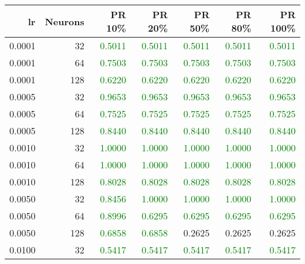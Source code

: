 \begin{tabular}{rrrrrrr}
\toprule
lr & Neurons & PR 10\% & PR 20\% & PR 50\% & PR 80\% & PR 100\% \\
\midrule
0.0001 & 32 & \textcolor{green} {0.5011} & \textcolor{green} {0.5011} & \textcolor{green} {0.5011} & \textcolor{green} {0.5011} & \textcolor{green} {0.5011} \\
0.0001 & 64 & \textcolor{green} {0.7503} & \textcolor{green} {0.7503} & \textcolor{green} {0.7503} & \textcolor{green} {0.7503} & \textcolor{green} {0.7503} \\
0.0001 & 128 & \textcolor{green} {0.6220} & \textcolor{green} {0.6220} & \textcolor{green} {0.6220} & \textcolor{green} {0.6220} & \textcolor{green} {0.6220} \\
0.0005 & 32 & \textcolor{green} {0.9653} & \textcolor{green} {0.9653} & \textcolor{green} {0.9653} & \textcolor{green} {0.9653} & \textcolor{green} {0.9653} \\
0.0005 & 64 & \textcolor{green} {0.7525} & \textcolor{green} {0.7525} & \textcolor{green} {0.7525} & \textcolor{green} {0.7525} & \textcolor{green} {0.7525} \\
0.0005 & 128 & \textcolor{green} {0.8440} & \textcolor{green} {0.8440} & \textcolor{green} {0.8440} & \textcolor{green} {0.8440} & \textcolor{green} {0.8440} \\
0.0010 & 32 & \textcolor{green} {1.0000} & \textcolor{green} {1.0000} & \textcolor{green} {1.0000} & \textcolor{green} {1.0000} & \textcolor{green} {1.0000} \\
0.0010 & 64 & \textcolor{green} {1.0000} & \textcolor{green} {1.0000} & \textcolor{green} {1.0000} & \textcolor{green} {1.0000} & \textcolor{green} {1.0000} \\
0.0010 & 128 & \textcolor{green} {0.8028} & \textcolor{green} {0.8028} & \textcolor{green} {0.8028} & \textcolor{green} {0.8028} & \textcolor{green} {0.8028} \\
0.0050 & 32 & \textcolor{green} {0.8456} & \textcolor{green} {1.0000} & \textcolor{green} {1.0000} & \textcolor{green} {1.0000} & \textcolor{green} {1.0000} \\
0.0050 & 64 & \textcolor{green} {0.8996} & \textcolor{green} {0.6295} & \textcolor{green} {0.6295} & \textcolor{green} {0.6295} & \textcolor{green} {0.6295} \\
0.0050 & 128 & \textcolor{green} {0.6858} & \textcolor{green} {0.6858} & \textcolor{blu} {0.2625} & \textcolor{blu} {0.2625} & \textcolor{blu} {0.2625} \\
0.0100 & 32 & \textcolor{green} {0.5417} & \textcolor{green} {0.5417} & \textcolor{green} {0.5417} & \textcolor{green} {0.5417} & \textcolor{green} {0.5417} \\

\end{tabular}

